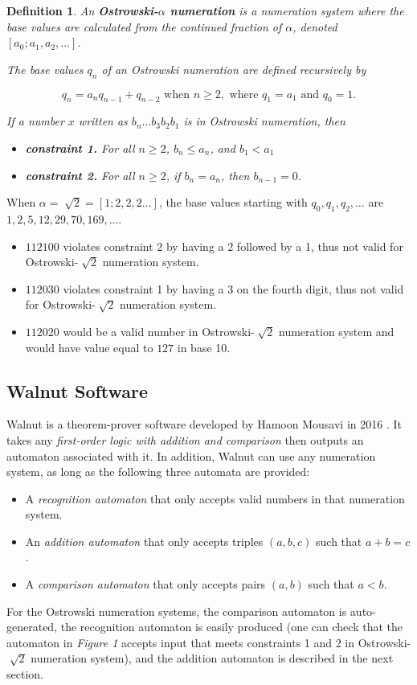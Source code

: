 \documentclass[a4paper]{article}
\newtheorem{definition}{Definition}
\begin{document}
\begin{definition}
An \textbf{Ostrowski-$\alpha$ numeration} is a numeration system where the base values are calculated from the continued fraction of $\alpha$, denoted $[a_0; a_{1},a_{2}, \ldots]$.

The base values $q_{n}$ of an Ostrowski numeration are defined recursively by{

$$q_{n}=a_{n}q_{n-1}+q_{n-2} \text{ when } n \ge 2, \text{ where } q_{1}=a_1 \text{ and } q_{0}=1.$$}
If a number $x$ written as $b_n\dots b_3b_2b_1$ is in Ostrowski numeration, then
\begin{itemize}
\item \textbf{constraint 1.} For all $n\ge 2$, $b_n\le a_n$, and $b_1 < a_1$
\item \textbf{constraint 2.} For all $n\ge 2$, if $b_{n} = a_{n}$, then $b_{n-1} = 0$.
\end{itemize}
\end{definition}

When $\alpha = \sqrt[~]{2} = [1;2,2,2\dots]$, the base values starting with $q_0, q_1, q_2, \dots$ are $1, 2, 5, 12, 29, 70, 169, \dots$.\\
\begin{itemize}
\item $112100$ violates constraint 2 by having a 2 followed by a 1, thus not valid for Ostrowski-$\sqrt[~]{2}$ numeration system.
\item $112030$ violates constraint 1 by having a 3 on the fourth digit, thus not valid for Ostrowski-$\sqrt[~]{2}$ numeration system.
\item $112020$ would be a valid number in Ostrowski-$\sqrt[~]{2}$ numeration system and would have value equal to $127$ in base 10.\\
\end{itemize}


\subsection{Walnut Software}


Walnut is a theorem-prover software developed by Hamoon Mousavi in 2016 \cite{walnut}. It takes any \emph{first-order logic with addition and comparison} then outputs an automaton associated with it. In addition, Walnut can use any numeration system, as long as the following three automata are provided:
\begin{itemize}
\item A \emph{recognition automaton} that only accepts valid numbers in that numeration system.
\item An \emph{addition automaton} that only accepts triples $(a,b,c)$ such that $a+b=c$.
\item A \emph{comparison automaton} that only accepts pairs $(a,b)$ such that $a<b$.
\end{itemize}
For the Ostrowski numeration systems, the comparison automaton is auto-generated, the recognition automaton is easily produced (one can check that the automaton in \emph{Figure 1} accepts input that meets constraints 1 and 2 in Ostrowski-$\sqrt[~]{2}$ numeration system), and the addition automaton is described in the next section.
\end{document}
